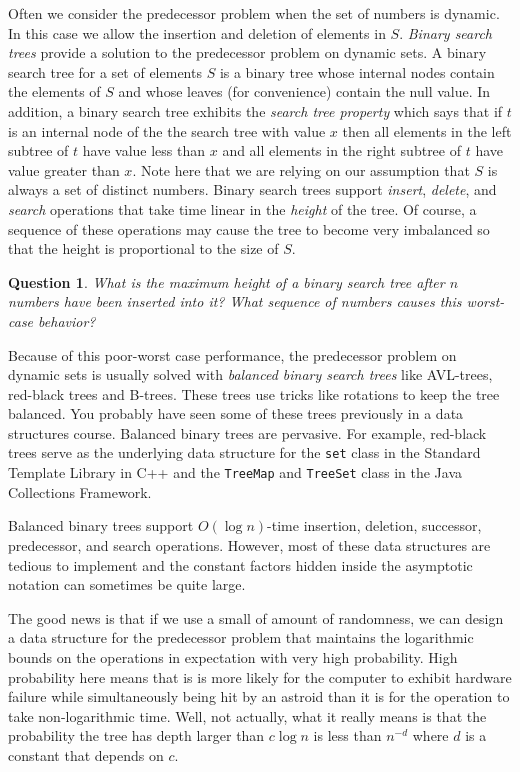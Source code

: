 \documentclass[11pt]{article}
\newtheorem{question}{Question}
\begin{document}
Often we consider the predecessor problem when the set of numbers is dynamic.  In this case we allow the insertion and deletion of elements in $S$.  {\em Binary search trees} provide a solution to the predecessor problem on dynamic sets.  A binary search tree for a set of elements $S$ is a binary tree whose internal nodes contain the elements of $S$ and whose leaves (for convenience) contain the null value.  In addition, a binary search tree exhibits the {\em search tree property} which says that if $t$ is an internal node of the the search tree with value $x$ then all elements in the left subtree of $t$ have value less than $x$ and all elements in the right subtree of $t$ have value greater than $x$.  Note here that we are relying on our assumption that $S$ is always a set of distinct numbers.  Binary search trees support {\em insert}, {\em delete}, and {\em search} operations that take time linear in the {\em height} of the tree.  Of course, a sequence of these operations may cause the tree to become very imbalanced so that the height is proportional to the size of $S$.  

\begin{question}
What is the maximum height of a binary search tree after $n$ numbers have been inserted into it?  What sequence of numbers causes this worst-case behavior?  
\end{question}

Because of this poor-worst case performance, the predecessor problem on dynamic sets is usually solved with {\em balanced binary search trees} like AVL-trees, red-black trees and B-trees.  These trees use tricks like rotations to keep the tree balanced.  You probably have seen some of these trees previously in a data structures course.  Balanced binary trees are pervasive.  For example, red-black trees serve as the underlying data structure for the {\tt set} class in the Standard Template Library in C++ and the {\tt TreeMap} and {\tt TreeSet} class in the Java Collections Framework.

Balanced binary trees support $O(\log n)$-time insertion, deletion, successor, predecessor, and search operations.  However, most of these data structures are tedious to implement and the constant factors hidden inside the asymptotic notation can sometimes be quite large.

The good news is that if we use a small of amount of randomness, we can design a data structure for the predecessor problem that maintains the logarithmic bounds on the operations in expectation with very high probability.  High probability here means that is is more likely for the computer to exhibit hardware failure while simultaneously being hit by an astroid than it is for the operation to take non-logarithmic time.  Well, not actually, what it really means is that the probability the tree has depth larger than $c\log n$ is less than $n^{-d}$ where $d$ is a constant that depends on $c$.
\end{document}
